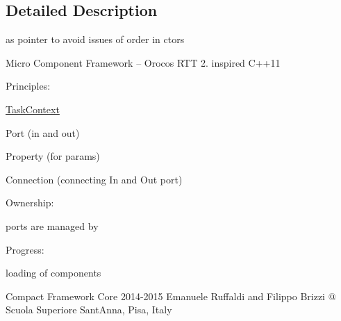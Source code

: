 \subsection{Detailed Description}
as pointer to avoid issues of order in ctors 

Micro Component Framework -- Orocos R\+T\+T 2. inspired C++11

Principles\+:
\begin{DoxyItemize}
\item \hyperlink{classcoco_1_1_task_context}{Task\+Context}
\item Port (in and out)
\item Property (for params)
\item Connection (connecting In and Out port)
\end{DoxyItemize}

Ownership\+:
\begin{DoxyItemize}
\item ports are managed by
\end{DoxyItemize}

Progress\+:
\begin{DoxyItemize}
\item loading of components
\end{DoxyItemize}

Compact Framework Core 2014-\/2015 Emanuele Ruffaldi and Filippo Brizzi @ Scuola Superiore Sant\textquotesingle{}Anna, Pisa, Italy 